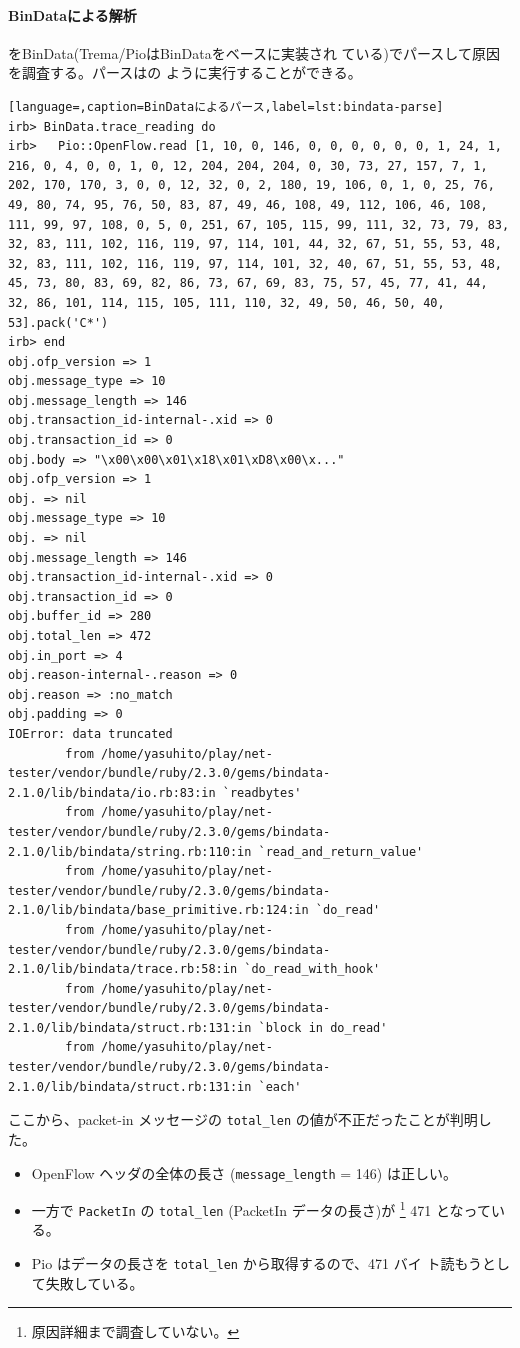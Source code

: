     \paragraph{BinDataによる解析}
をBinData(Trema/PioはBinDataをベースに実装され
ている)でパースして原因を調査する。パースはの
ように実行することができる。

\begin{lstlisting}[language=,caption=BinDataによるパース,label=lst:bindata-parse]
irb> BinData.trace_reading do
irb>   Pio::OpenFlow.read [1, 10, 0, 146, 0, 0, 0, 0, 0, 0, 1, 24, 1, 216, 0, 4, 0, 0, 1, 0, 12, 204, 204, 204, 0, 30, 73, 27, 157, 7, 1, 202, 170, 170, 3, 0, 0, 12, 32, 0, 2, 180, 19, 106, 0, 1, 0, 25, 76, 49, 80, 74, 95, 76, 50, 83, 87, 49, 46, 108, 49, 112, 106, 46, 108, 111, 99, 97, 108, 0, 5, 0, 251, 67, 105, 115, 99, 111, 32, 73, 79, 83, 32, 83, 111, 102, 116, 119, 97, 114, 101, 44, 32, 67, 51, 55, 53, 48, 32, 83, 111, 102, 116, 119, 97, 114, 101, 32, 40, 67, 51, 55, 53, 48, 45, 73, 80, 83, 69, 82, 86, 73, 67, 69, 83, 75, 57, 45, 77, 41, 44, 32, 86, 101, 114, 115, 105, 111, 110, 32, 49, 50, 46, 50, 40, 53].pack('C*')
irb> end
obj.ofp_version => 1
obj.message_type => 10
obj.message_length => 146
obj.transaction_id-internal-.xid => 0
obj.transaction_id => 0
obj.body => "\x00\x00\x01\x18\x01\xD8\x00\x..."
obj.ofp_version => 1
obj. => nil
obj.message_type => 10
obj. => nil
obj.message_length => 146
obj.transaction_id-internal-.xid => 0
obj.transaction_id => 0
obj.buffer_id => 280
obj.total_len => 472
obj.in_port => 4
obj.reason-internal-.reason => 0
obj.reason => :no_match
obj.padding => 0
IOError: data truncated
        from /home/yasuhito/play/net-tester/vendor/bundle/ruby/2.3.0/gems/bindata-2.1.0/lib/bindata/io.rb:83:in `readbytes'
        from /home/yasuhito/play/net-tester/vendor/bundle/ruby/2.3.0/gems/bindata-2.1.0/lib/bindata/string.rb:110:in `read_and_return_value'
        from /home/yasuhito/play/net-tester/vendor/bundle/ruby/2.3.0/gems/bindata-2.1.0/lib/bindata/base_primitive.rb:124:in `do_read'
        from /home/yasuhito/play/net-tester/vendor/bundle/ruby/2.3.0/gems/bindata-2.1.0/lib/bindata/trace.rb:58:in `do_read_with_hook'
        from /home/yasuhito/play/net-tester/vendor/bundle/ruby/2.3.0/gems/bindata-2.1.0/lib/bindata/struct.rb:131:in `block in do_read'
        from /home/yasuhito/play/net-tester/vendor/bundle/ruby/2.3.0/gems/bindata-2.1.0/lib/bindata/struct.rb:131:in `each'
\end{lstlisting}

ここから、packet-in メッセージの \verb|total_len| の値が不正だったことが判明した。
\begin{itemize}
 \item OpenFlow ヘッダの全体の長さ (\verb|message_length| = 146) は正しい。
 \item 一方で \verb|PacketIn| の \verb|total_len| (PacketIn データの長さ)が
       \footnote{原因詳細まで調査していない。} 471 となっている。
 \item Pio はデータの長さを \verb|total_len| から取得するので、471 バイ
       ト読もうとして失敗している。
\end{itemize}

